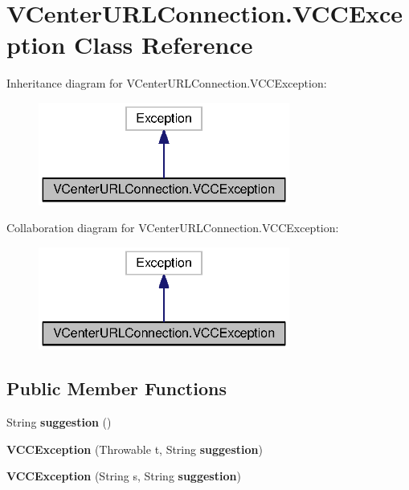 \section{V\+Center\+U\+R\+L\+Connection.\+V\+C\+C\+Exception Class Reference}
\label{classorg_1_1smallfoot_1_1parser_1_1vmware_1_1VCenterURLConnection_1_1VCCException}


Inheritance diagram for V\+Center\+U\+R\+L\+Connection.\+V\+C\+C\+Exception\+:
\nopagebreak
\begin{figure}[H]
\begin{center}
\leavevmode
\includegraphics[width=234pt]{classorg_1_1smallfoot_1_1parser_1_1vmware_1_1VCenterURLConnection_1_1VCCException__inherit__graph}
\end{center}
\end{figure}


Collaboration diagram for V\+Center\+U\+R\+L\+Connection.\+V\+C\+C\+Exception\+:
\nopagebreak
\begin{figure}[H]
\begin{center}
\leavevmode
\includegraphics[width=234pt]{classorg_1_1smallfoot_1_1parser_1_1vmware_1_1VCenterURLConnection_1_1VCCException__coll__graph}
\end{center}
\end{figure}
\subsection*{Public Member Functions}
\begin{DoxyCompactItemize}
\item 
String {\bf suggestion} ()
\item 
{\bf V\+C\+C\+Exception} (Throwable t, String {\bf suggestion})
\item 
{\bf V\+C\+C\+Exception} (String s, String {\bf suggestion})
\end{DoxyCompactItemize}

